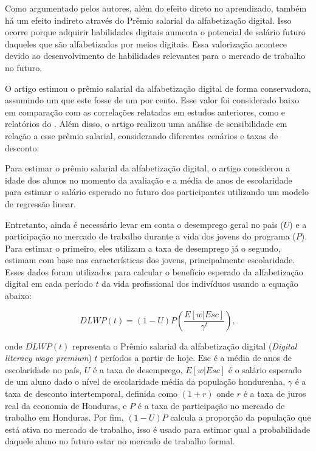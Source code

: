 \documentclass[12pt,letterpaper]{article}
\newcommand{\1}{\mathbbm{1}}
\numberwithin{equation}{section}
\begin{document}
Como argumentado pelos autores, além do efeito direto no aprendizado, também há um efeito indireto através do Prêmio salarial da alfabetização digital. Isso ocorre porque adquirir habilidades digitais aumenta o potencial de salário futuro daqueles que são alfabetizados por meios digitais. Essa valorização acontece devido ao desenvolvimento de habilidades relevantes para o mercado de trabalho no futuro.

O artigo estimou o prêmio salarial da alfabetização digital de forma conservadora, assumindo um que este fosse de um por cento. Esse valor foi considerado baixo em comparação com as correlações relatadas em estudos anteriores, como \cite{krueger1993computers} e relatórios do \cite{world2016world}. Além disso, o artigo realizou uma análise de sensibilidade em relação a esse prêmio salarial, considerando diferentes cenários e taxas de desconto.


Para estimar o prêmio salarial da alfabetização digital, o artigo considerou a idade dos alunos no momento da avaliação e a média de anos de escolaridade para estimar o salário esperado no futuro dos participantes utilizando um modelo de regressão linear.

Entretanto, ainda é necessário levar em conta o desemprego geral no pais ($U$) e a participação no mercado de trabalho durante a vida dos jovens do programa ($P$). Para estimar o primeiro, eles utilizam a taxa de desemprego já o segundo, estimam com base nas características dos jovens, principalmente escolaridade. Esses dados foram utilizados para calcular o benefício esperado da alfabetização digital em cada período $t$ da vida profissional dos indivíduos usando a equação abaixo: 

\[
DLWP(t) = (1-U)P \left(\frac{{E[w | Esc]}}{\gamma^t}\right),
\]

\noindent onde \( DLWP(t) \) representa o Prêmio salarial da alfabetização digital (\textit{Digital literacy wage premium}) \(t\) períodos a partir de hoje. \( \text{{Esc}} \) é a média de anos de escolaridade no país, \( U \) é a taxa de desemprego, \( E[w | Esc] \) é o salário esperado de um aluno dado o nível de escolaridade média da população hondurenha, \( \gamma \) é a taxa de desconto intertemporal, definida como \( (1+r) \) onde \( r \) é a taxa de juros real da economia de Honduras, e \( P \) é a taxa de participação no mercado de trabalho em Honduras. Por fim, $(1-U)P$ calcula a proporção da população que está ativa no mercado de trabalho, isso é usado para estimar qual a probabilidade daquele aluno no futuro estar no mercado de trabalho formal.
\end{document}
